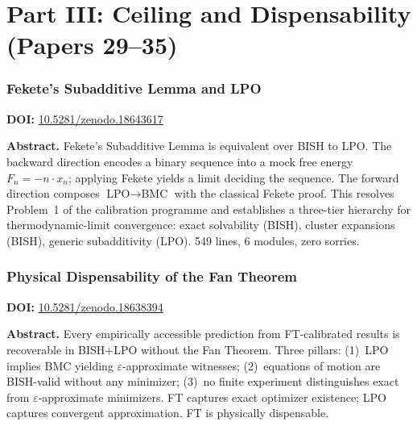 \documentclass[11pt,a4paper]{article}
\begin{document}
\newpage
\part*{Part III: Ceiling and Dispensability (Papers 29--35)}

\section{Fekete's Subadditive Lemma and LPO}
\label{sec:p29}
\textbf{DOI:} \href{https://doi.org/10.5281/zenodo.18643617}{10.5281/zenodo.18643617}

\bigskip
\noindent\textbf{Abstract.}
Fekete's Subadditive Lemma is equivalent over BISH to LPO. The backward direction encodes a binary sequence into a mock free energy $F_n=-n\cdot x_n$; applying Fekete yields a limit deciding the sequence. The forward direction composes $\text{LPO}\to\text{BMC}$ with the classical Fekete proof. This resolves Problem~1 of the calibration programme and establishes a three-tier hierarchy for thermodynamic-limit convergence: exact solvability (BISH), cluster expansions (BISH), generic subadditivity (LPO). 549 lines, 6 modules, zero sorries.

\section{Physical Dispensability of the Fan Theorem}
\label{sec:p30}
\textbf{DOI:} \href{https://doi.org/10.5281/zenodo.18638394}{10.5281/zenodo.18638394}

\bigskip
\noindent\textbf{Abstract.}
Every empirically accessible prediction from FT-calibrated results is recoverable in BISH+LPO without the Fan Theorem. Three pillars: (1)~LPO implies BMC yielding $\varepsilon$-approximate witnesses; (2)~equations of motion are BISH-valid without any minimizer; (3)~no finite experiment distinguishes exact from $\varepsilon$-approximate minimizers. FT captures exact optimizer existence; LPO captures convergent approximation. FT is physically dispensable.

\end{document}
